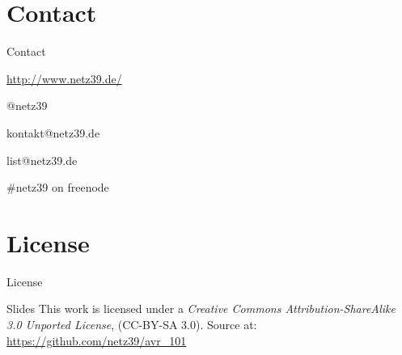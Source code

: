 \documentclass{beamer}
\begin{document}
\section{Contact}

\begin{frame}{Contact}
    \begin{center}
        \begin{description}
            \item[WWW] \url{http://www.netz39.de/}
            \item[Twitter/identi.ca] @netz39
            \item[E-Mail] kontakt@netz39.de
            \item[Mailingliste] list@netz39.de
            \item[IRC] \#netz39 on freenode
        \end{description}
    \end{center}
\end{frame}

\appendix

\section{License}

\begin{frame}{License}
    \begin{block}{Slides}
        This work is licensed under a \emph{Creative Commons
        Attribution-ShareAlike 3.0 Unported License}, (CC-BY-SA 3.0).
        Source at: \url{https://github.com/netz39/avr_101}
    \end{block}
\end{frame}
\end{document}

